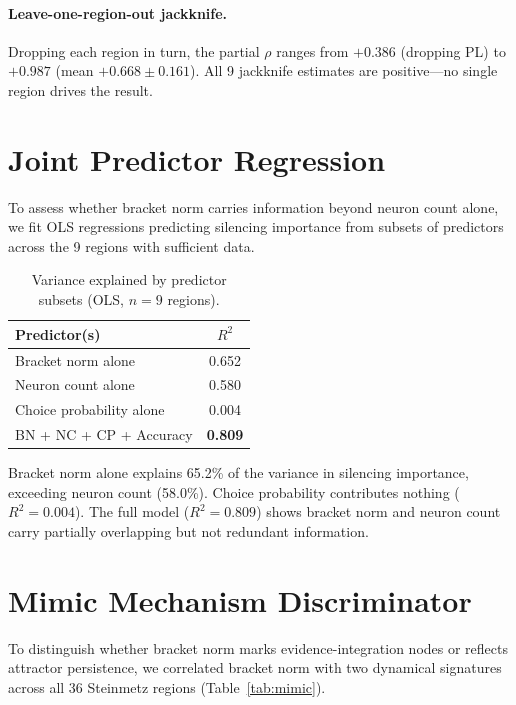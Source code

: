 \documentclass[9pt,lineno]{elife}
\begin{document}
\paragraph{Leave-one-region-out jackknife.} Dropping each region in turn, the partial $\rho$ ranges from $+0.386$ (dropping PL) to $+0.987$ (mean $+0.668 \pm 0.161$). All 9 jackknife estimates are positive---no single region drives the result.

\section{Joint Predictor Regression}
\label{app:joint}

To assess whether bracket norm carries information beyond neuron count alone, we fit OLS regressions predicting silencing importance from subsets of predictors across the 9 regions with sufficient data.

\begin{table}[h]
\centering
\caption{Variance explained by predictor subsets (OLS, $n = 9$ regions).}
\label{tab:joint}
\begin{tabular}{lc}
\toprule
Predictor(s) & $R^2$ \\
\midrule
Bracket norm alone & 0.652 \\
Neuron count alone & 0.580 \\
Choice probability alone & 0.004 \\
BN + NC + CP + Accuracy & \textbf{0.809} \\
\bottomrule
\end{tabular}
\end{table}

Bracket norm alone explains 65.2\% of the variance in silencing importance, exceeding neuron count (58.0\%). Choice probability contributes nothing ($R^2 = 0.004$). The full model ($R^2 = 0.809$) shows bracket norm and neuron count carry partially overlapping but not redundant information.

\section{Mimic Mechanism Discriminator}
\label{app:mimic}

To distinguish whether bracket norm marks evidence-integration nodes or reflects attractor persistence, we correlated bracket norm with two dynamical signatures across all 36 Steinmetz regions (Table~\ref{tab:mimic}).
\end{document}
